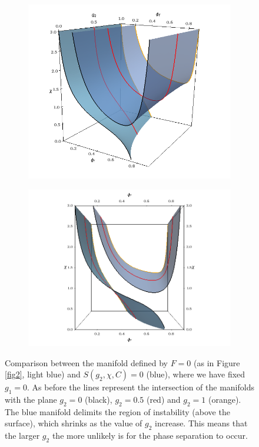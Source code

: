 \documentclass[12pt]{extarticle}
\begin{document}
\begin{figure}[h!]
	\begin{subfigure}{0.45\textwidth}
		\hspace{-18mm}
		\includegraphics[scale=0.4]{images/stab1}
		\caption{}
	\end{subfigure}
\hspace{15mm}
	\begin{subfigure}{0.53\textwidth}
		\hspace{-18mm}
		\includegraphics[scale=0.4]{images/stab2}
		\caption{}
	\end{subfigure}
\caption{Comparison between the manifold defined by $F=0$ (as in Figure \ref{fig2}, light blue) and $S(g_2,\chi,C)=0$ (blue), where we have fixed $g_1=0$. As before the lines represent the intersection of the manifolds with the plane $g_2=0$ (black), $g_2=0.5$ (red) and $g_2=1$ (orange). The blue manifold delimits the region of instability (above the surface), which shrinks as the value of $g_2$ increase. This means that the larger $g_2$ the more unlikely is for the phase separation to occur.}
\end{figure}
\end{document}
